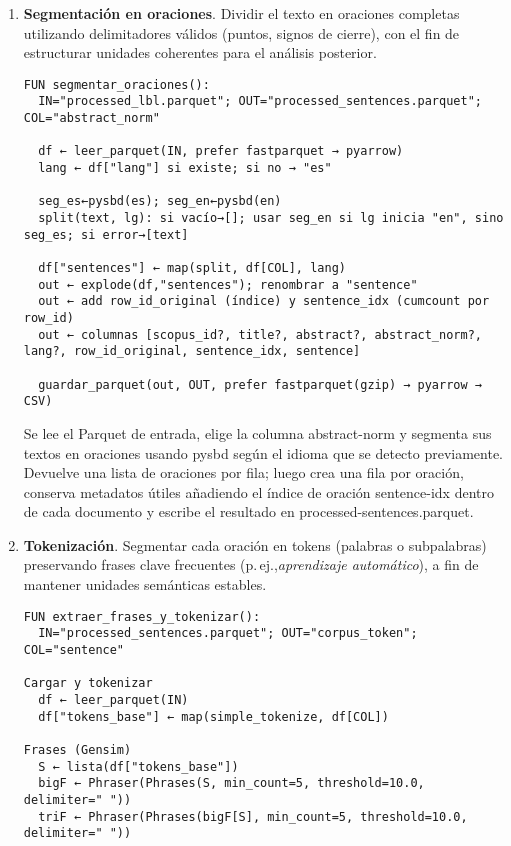 \begin{enumerate}
 \item \textbf{Segmentación en oraciones}. Dividir el texto en oraciones completas utilizando delimitadores válidos (puntos, signos de cierre), con el fin de 
    estructurar unidades coherentes para el análisis posterior. 

\begin{verbatim}
FUN segmentar_oraciones():
  IN="processed_lbl.parquet"; OUT="processed_sentences.parquet"; COL="abstract_norm"

  df ← leer_parquet(IN, prefer fastparquet → pyarrow)
  lang ← df["lang"] si existe; si no → "es"

  seg_es←pysbd(es); seg_en←pysbd(en)
  split(text, lg): si vacío→[]; usar seg_en si lg inicia "en", sino seg_es; si error→[text]

  df["sentences"] ← map(split, df[COL], lang)
  out ← explode(df,"sentences"); renombrar a "sentence"
  out ← add row_id_original (índice) y sentence_idx (cumcount por row_id)
  out ← columnas [scopus_id?, title?, abstract?, abstract_norm?, lang?, row_id_original, sentence_idx, sentence]

  guardar_parquet(out, OUT, prefer fastparquet(gzip) → pyarrow → CSV)
\end{verbatim}
Se lee el Parquet de entrada, elige la columna abstract-norm y segmenta sus textos en oraciones usando pysbd según el idioma que se detecto previamente.
Devuelve una lista de oraciones por fila; luego crea una fila por oración, conserva metadatos útiles 
añadiendo el índice de oración sentence-idx dentro de cada documento y escribe el resultado en processed-sentences.parquet.

    \item \textbf{Tokenización}. Segmentar cada oración en tokens (palabras o subpalabras) preservando frases clave frecuentes (p.\,ej.,\textit{aprendizaje automático}), a fin de mantener unidades semánticas estables.
\begin{verbatim}
FUN extraer_frases_y_tokenizar():
  IN="processed_sentences.parquet"; OUT="corpus_token"; COL="sentence"

Cargar y tokenizar
  df ← leer_parquet(IN)                     
  df["tokens_base"] ← map(simple_tokenize, df[COL])

Frases (Gensim)
  S ← lista(df["tokens_base"])
  bigF ← Phraser(Phrases(S, min_count=5, threshold=10.0, delimiter=" "))
  triF ← Phraser(Phrases(bigF[S], min_count=5, threshold=10.0, delimiter=" "))


\end{verbatim}
\end{enumerate}
